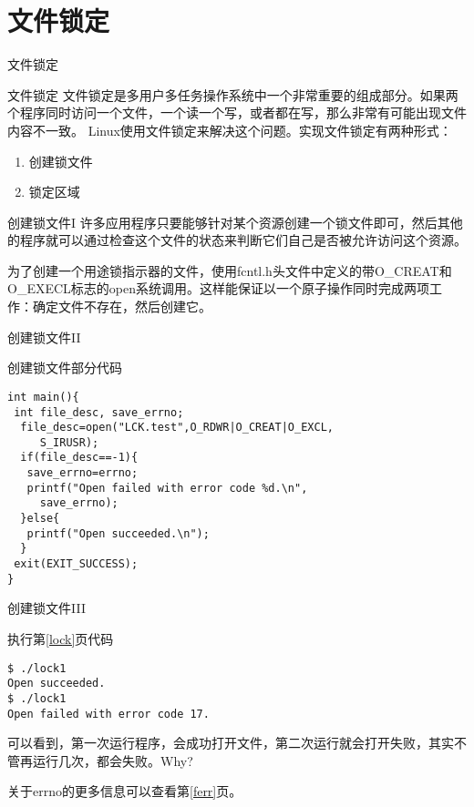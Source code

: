 \documentclass{beamer}
\begin{document}
\section{文件锁定}
\begin{frame}
\Huge{\centerline{文件锁定}}
\end{frame}
\begin{frame}{文件锁定}
文件锁定是多用户多任务操作系统中一个非常重要的组成部分。如果两个程序同时访问一个文件，一个读一个写，或者都在写，那么非常有可能出现文件内容不一致。
Linux使用文件锁定来解决这个问题。实现文件锁定有两种形式：
\begin{enumerate}
\item
创建锁文件
\item
锁定区域
\end{enumerate}
\end{frame}
\begin{frame}[fragile]{创建锁文件I}
许多应用程序只要能够针对某个资源创建一个锁文件即可，然后其他的程序就可以通过检查这个文件的状态来判断它们自己是否被允许访问这个资源。

为了创建一个用途锁指示器的文件，使用fcntl.h头文件中定义的带O\_CREAT和O\_EXECL标志的open系统调用。这样能保证以一个原子操作同时完成两项工作：确定文件不存在，然后创建它。
\end{frame}
\begin{frame}[fragile]{创建锁文件II}
\label{lock}
\begin{block}{创建锁文件部分代码}
\begin{lstlisting}
int main(){
 int file_desc, save_errno;	
  file_desc=open("LCK.test",O_RDWR|O_CREAT|O_EXCL,
     S_IRUSR);
  if(file_desc==-1){
   save_errno=errno;
   printf("Open failed with error code %d.\n",
     save_errno);
  }else{
   printf("Open succeeded.\n");
  }
 exit(EXIT_SUCCESS);
}
\end{lstlisting}
\end{block}
\end{frame}
\begin{frame}[fragile]{创建锁文件III}
\begin{block}{执行第\ref{lock}页代码}
\begin{lstlisting}
$ ./lock1 
Open succeeded.
$ ./lock1 
Open failed with error code 17.
\end{lstlisting}
\end{block}
可以看到，第一次运行程序，会成功打开文件，第二次运行就会打开失败，其实不管再运行几次，都会失败。Why?

关于errno的更多信息可以查看第\ref{ferr}页。
\end{frame}
\end{document}
